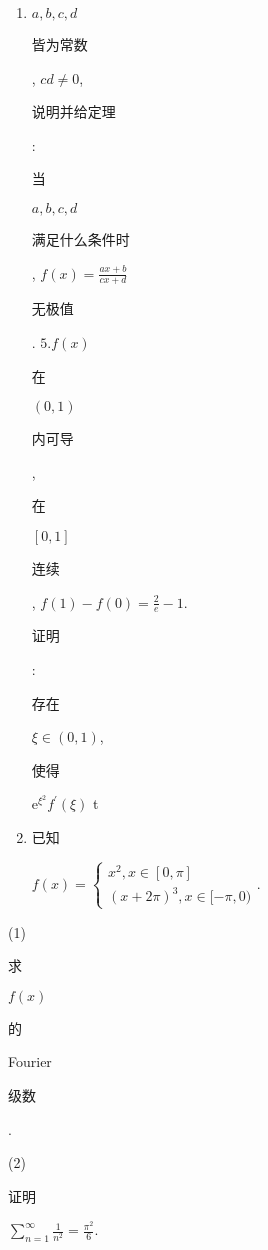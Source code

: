 \documentclass[10pt]{article}
\begin{document}
\begin{enumerate}
  \item $a, b, c, d$ \begin{CJK}{UTF8}{mj}皆为常数\end{CJK}, $c d \neq 0$, \begin{CJK}{UTF8}{mj}说明并给定理\end{CJK}: \begin{CJK}{UTF8}{mj}当\end{CJK} $a, b, c, d$ \begin{CJK}{UTF8}{mj}满足什么条件时\end{CJK}, $f(x)=\frac{a x+b}{c x+d}$ \begin{CJK}{UTF8}{mj}无极值\end{CJK}. $5 . f(x)$ \begin{CJK}{UTF8}{mj}在\end{CJK} $(0,1)$ \begin{CJK}{UTF8}{mj}内可导\end{CJK}, \begin{CJK}{UTF8}{mj}在\end{CJK} $[0,1]$ \begin{CJK}{UTF8}{mj}连续\end{CJK}, $f(1)-f(0)=\frac{2}{e}-1$. \begin{CJK}{UTF8}{mj}证明\end{CJK}: \begin{CJK}{UTF8}{mj}存在\end{CJK} $\xi \in(0,1)$, \begin{CJK}{UTF8}{mj}使得\end{CJK} $\mathrm{e}^{\xi^{2}} f^{\prime}(\xi)$ t

  \item \begin{CJK}{UTF8}{mj}已知\end{CJK} $f(x)=\left\{\begin{array}{l}x^{2}, x \in[0, \pi] \\ (x+2 \pi)^{3}, x \in[-\pi, 0)\end{array}\right.$.

\end{enumerate}
(1) \begin{CJK}{UTF8}{mj}求\end{CJK} $f(x)$ \begin{CJK}{UTF8}{mj}的\end{CJK} Fourier \begin{CJK}{UTF8}{mj}级数\end{CJK}.

(2) \begin{CJK}{UTF8}{mj}证明\end{CJK} $\sum_{n=1}^{\infty} \frac{1}{n^{2}}=\frac{\pi^{2}}{6}$.
\end{document}
